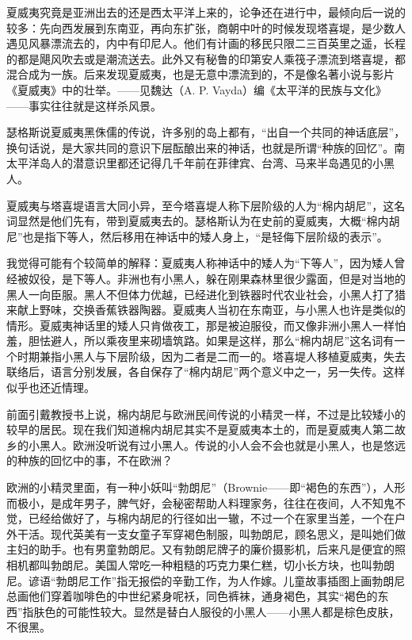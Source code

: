 \par 夏威夷究竟是亚洲出去的还是西太平洋上来的，论争还在进行中，最倾向后一说的较多：先向西发展到东南亚，再向东扩张，商朝中叶的时候发现塔喜堤，是少数人遇见风暴漂流去的，内中有印尼人。他们有计画的移民只限二三百英里之遥，长程的都是飓风吹去或是潮流送去。此外又有秘鲁的印第安人乘筏子漂流到塔喜堤，都混合成为一族。后来发现夏威夷，也是无意中漂流到的，不是像名著小说与影片《夏威夷》中的壮举。——见魏达（A. P. Vayda）编《太平洋的民族与文化》——事实往往就是这样杀风景。
\par 瑟格斯说夏威夷黑侏儒的传说，许多别的岛上都有，“出自一个共同的神话底层”，换句话说，是大家共同的意识下层酝酿出来的神话，也就是所谓“种族的回忆”。南太平洋岛人的潜意识里都还记得几千年前在菲律宾、台湾、马来半岛遇见的小黑人。
\par 夏威夷与塔喜堤语言大同小异，至今塔喜堤人称下层阶级的人为“棉内胡尼”，这名词显然是他们先有，带到夏威夷去的。瑟格斯认为在史前的夏威夷，大概“棉内胡尼”也是指下等人，然后移用在神话中的矮人身上，“是轻侮下层阶级的表示”。
\par 我觉得可能有个较简单的解释：夏威夷人称神话中的矮人为“下等人”，因为矮人曾经被奴役，是下等人。非洲也有小黑人，躲在刚果森林里很少露面，但是对当地的黑人一向臣服。黑人不但体力优越，已经进化到铁器时代农业社会，小黑人打了猎来献上野味，交换香蕉铁器陶器。夏威夷人当初在东南亚，与小黑人也许是类似的情形。夏威夷神话里的矮人只肯做夜工，那是被迫服役，而又像非洲小黑人一样怕羞，胆怯避人，所以乘夜里来砌墙筑路。如果是这样，那么“棉内胡尼”这名词有一个时期兼指小黑人与下层阶级，因为二者是二而一的。塔喜堤人移植夏威夷，失去联络后，语言分别发展，各自保存了“棉内胡尼”两个意义中之一，另一失传。这样似乎也还近情理。
\par 前面引戴教授书上说，棉内胡尼与欧洲民间传说的小精灵一样，不过是比较矮小的较早的居民。现在我们知道棉内胡尼其实不是夏威夷本土的，而是夏威夷人第二故乡的小黑人。欧洲没听说有过小黑人。传说的小人会不会也就是小黑人，也是悠远的种族的回忆中的事，不在欧洲？
\par 欧洲的小精灵里面，有一种小妖叫“勃朗尼”（Brownie——即“褐色的东西”），人形而极小，是成年男子，脾气好，会秘密帮助人料理家务，往往在夜间，人不知鬼不觉，已经给做好了，与棉内胡尼的行径如出一辙，不过一个在家里当差，一个在户外干活。现代英美有一支女童子军穿褐色制服，叫勃朗尼，顾名思义，是叫她们做主妇的助手。也有男童勃朗尼。又有勃朗尼牌子的廉价摄影机，后来凡是便宜的照相机都叫勃朗尼。美国人常吃一种粗糙的巧克力果仁糕，切小长方块，也叫勃朗尼。谚语“勃朗尼工作”指无报偿的辛勤工作，为人作嫁。儿童故事插图上画勃朗尼总画他们穿着咖啡色的中世纪紧身呢袄，同色裤袜，通身褐色，其实“褐色的东西”指肤色的可能性较大。显然是替白人服役的小黑人——小黑人都是棕色皮肤，不很黑。
